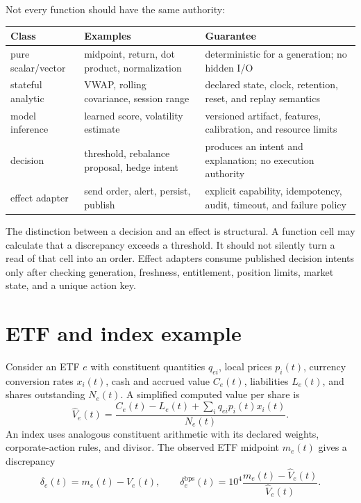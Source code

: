 \documentclass{strategynet-journal}
\begin{document}
Not every function should have the same authority:
\begin{center}
\begin{tabularx}{\textwidth}{@{}p{}p{}X@{}}
\toprule
Class & Examples & Guarantee \\
\midrule
pure scalar/vector & midpoint, return, dot product, normalization &
deterministic for a generation; no hidden I/O \\
stateful analytic & VWAP, rolling covariance, session range &
declared state, clock, retention, reset, and replay semantics \\
model inference & learned score, volatility estimate &
versioned artifact, features, calibration, and resource limits \\
decision & threshold, rebalance proposal, hedge intent &
produces an intent and explanation; no execution authority \\
effect adapter & send order, alert, persist, publish &
explicit capability, idempotency, audit, timeout, and failure policy \\
\bottomrule
\end{tabularx}
\end{center}

The distinction between a decision and an effect is structural.  A function
cell may calculate that a discrepancy exceeds a threshold.  It should not
silently turn a read of that cell into an order.  Effect adapters consume
published decision intents only after checking generation, freshness,
entitlement, position limits, market state, and a unique action key.

\section{ETF and index example}

Consider an ETF \(e\) with constituent quantities \(q_{ei}\), local prices
\(p_i(t)\), currency conversion rates \(x_i(t)\), cash and accrued value
\(C_e(t)\), liabilities \(L_e(t)\), and shares outstanding \(N_e(t)\).  A
simplified computed value per share is
\[
  \widehat V_e(t)=
  \frac{C_e(t)-L_e(t)+\sum_i q_{ei}p_i(t)x_i(t)}
       {N_e(t)}.
\]
An index uses analogous constituent arithmetic with its declared weights,
corporate-action rules, and divisor.  The observed ETF midpoint \(m_e(t)\)
gives a discrepancy
\[
  \delta_e(t)=m_e(t)-\widehat V_e(t),\qquad
  \delta^{\mathrm{bps}}_e(t)=
  10^4\frac{m_e(t)-\widehat V_e(t)}{\widehat V_e(t)}.
\]
\end{document}
